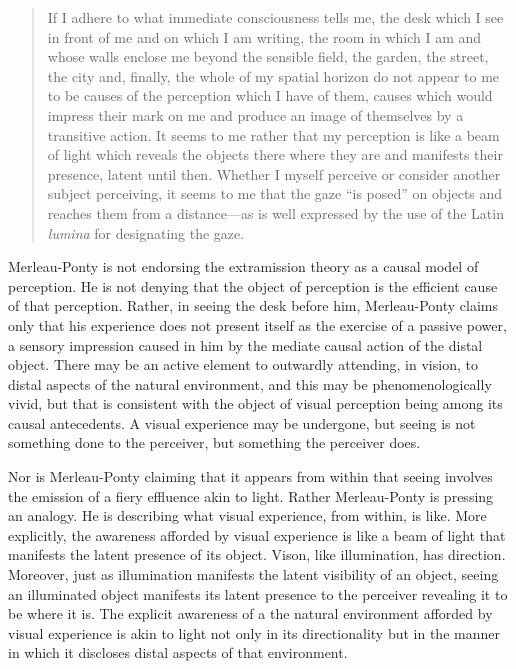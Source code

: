 \begin{quote}
	If I adhere to what immediate consciousness tells me, the desk which I see in front of me and on which I am writing, the room in which I am and whose walls enclose me beyond the sensible field, the garden, the street, the city and, finally, the whole of my spatial horizon do not appear to me to be causes of the perception which I have of them, causes which would impress their mark on me and produce an image of themselves by a transitive action. It seems to me rather that my perception is like a beam of light which reveals the objects there where they are and manifests their presence, latent until then. Whether I myself perceive or consider another subject perceiving, it seems to me that the gaze ``is posed'' on objects and reaches them from a distance---as is well expressed by the use of the Latin \emph{lumina} for designating the gaze. \citep[185]{Merleau-Ponty:1967fj}
\end{quote}
Merleau-Ponty is not endorsing the extramission theory as a causal model of perception. He is not denying that the object of perception is the efficient cause of that perception. Rather, in seeing the desk before him, Merleau-Ponty claims only that his experience does not present itself as the exercise of a passive power, a sensory impression caused in him by the mediate causal action of the distal object. There may be an active element to outwardly attending, in vision, to distal aspects of the natural environment, and this may be phenomenologically vivid, but that is consistent with the object of visual perception being among its causal antecedents. A visual experience may be undergone, but seeing is not something done to the perceiver, but something the perceiver does.

Nor is Merleau-Ponty claiming that it appears from within that seeing involves the emission of a fiery effluence akin to light. Rather Merleau-Ponty is pressing an analogy. He is describing what visual experience, from within, is like. More explicitly, the awareness afforded by visual experience is like a beam of light that manifests the latent presence of its object. Vison, like illumination, has direction. Moreover, just as illumination manifests the latent visibility of an object, seeing an illuminated object manifests its latent presence to the perceiver revealing it to be where it is. The explicit awareness of a the natural environment afforded by visual experience is akin to light not only in its directionality but in the manner in which it discloses distal aspects of that environment. 




